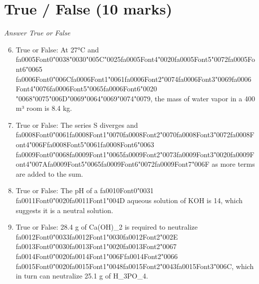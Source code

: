 \documentclass[12pt]{article}
\begin{document}
\section*{True / False (10 marks)}
\textit{Answer True or False}
\begin{enumerate}[label=\arabic*.]
\setcounter{enumi}{5}
\item True or False: At 27°C and {\csname fa0005Font0\endcsname\char"0038}{\char"0030}{\char"005C}{\char"0025}{\csname fa0005Font4\endcsname\char"0020}{\csname fa0005Font5\endcsname\char"0072}{\csname fa0005Font6\endcsname\char"0065} {\csname fa0006Font0\endcsname\char"006C}{\csname fa0006Font1\endcsname\char"0061}{\csname fa0006Font2\endcsname\char"0074}{\csname fa0006Font3\endcsname\char"0069}{\csname fa0006Font4\endcsname\char"0076}{\csname fa0006Font5\endcsname\char"0065}{\csname fa0006Font6\endcsname\char"0020} {\char"0068}{\char"0075}{\char"006D}{\char"0069}{\char"0064}{\char"0069}{\char"0074}{\char"0079}, the mass of water vapor in a 400 m³ room is 8.4 kg.
\item True or False: The series S diverges and {\csname fa0008Font0\endcsname\char"0061}{\csname fa0008Font1\endcsname\char"0070}{\csname fa0008Font2\endcsname\char"0070}{\csname fa0008Font3\endcsname\char"0072}{\csname fa0008Font4\endcsname\char"006F}{\csname fa0008Font5\endcsname\char"0061}{\csname fa0008Font6\endcsname\char"0063} {\csname fa0009Font0\endcsname\char"0068}{\csname fa0009Font1\endcsname\char"0065}{\csname fa0009Font2\endcsname\char"0073}{\csname fa0009Font3\endcsname\char"0020}{\csname fa0009Font4\endcsname\char"007A}{\csname fa0009Font5\endcsname\char"0065}{\csname fa0009Font6\endcsname\char"0072}{\csname fa0009Font7\endcsname\char"006F} as more terms are added to the sum.
\item True or False: The pH of a {\csname fa0010Font0\endcsname\char"0031} {\csname fa0011Font0\endcsname\char"0020}{\csname fa0011Font1\endcsname\char"004D} aqueous solution of KOH is 14, which suggests it is a neutral solution.
\item True or False: 28.4 g of Ca(OH)\_2 is required to neutralize {\csname fa0012Font0\endcsname\char"0033}{\csname fa0012Font1\endcsname\char"0030}{\csname fa0012Font2\endcsname\char"002E} {\csname fa0013Font0\endcsname\char"0030}{\csname fa0013Font1\endcsname\char"0020}{\csname fa0013Font2\endcsname\char"0067} {\csname fa0014Font0\endcsname\char"0020}{\csname fa0014Font1\endcsname\char"006F}{\csname fa0014Font2\endcsname\char"0066} {\csname fa0015Font0\endcsname\char"0020}{\csname fa0015Font1\endcsname\char"0048}{\csname fa0015Font2\endcsname\char"0043}{\csname fa0015Font3\endcsname\char"006C}, which in turn can neutralize 25.1 g of H\_3PO\_4.

\end{enumerate}
\end{document}
